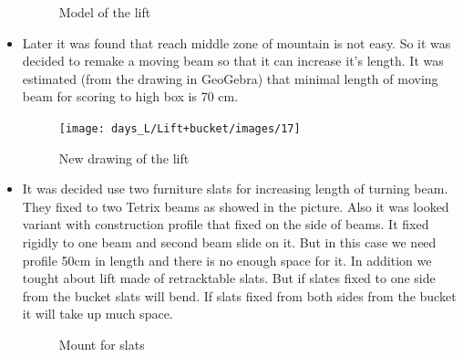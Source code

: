 \begin{itemize}
\begin{figure}[H]
\begin{minipage}[h]{0.6\linewidth}
		\caption{Model of the lift}
	\end{minipage}
\end{figure}

\item Later it was found that reach middle zone of mountain is not easy. So it was decided to remake a moving beam so that it can increase it's length. It was estimated (from the drawing in GeoGebra) that minimal length of moving beam for scoring to high box is 70 cm.
\begin{figure}[H]
	\begin{minipage}[h]{0.6\linewidth}
		{\texttt{[image: days\_L/Lift+bucket/images/17]}}
		\caption{New drawing of the lift}
	\end{minipage}
\end{figure}

\item It was decided use two furniture slats for increasing length of turning beam. They fixed to two Tetrix beams as showed in the picture. Also it was looked variant with construction profile that fixed on the side of beams. It fixed rigidly to one beam and second beam slide on it. But in this case we need profile 50cm in length and there is no enough space for it. In addition we tought about lift made of retracktable slats. But if slates fixed to one side from the bucket slats will bend. If slats fixed from both sides from the bucket it will take up much space.
\begin{figure}[H]
	\begin{minipage}[h]{\linewidth}
		\caption{Mount for slats}
	\end{minipage}

\end{figure}
\end{itemize}
